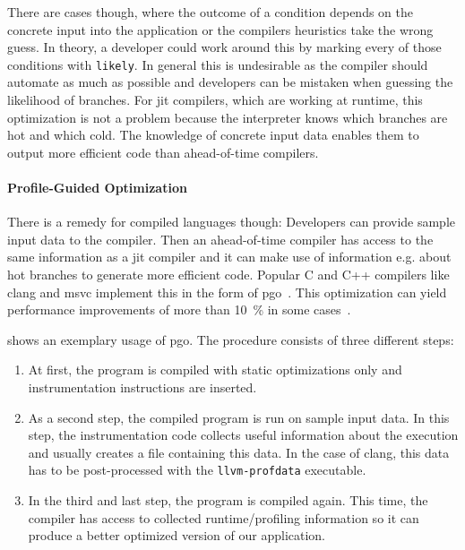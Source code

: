 There are cases though, where the outcome of a condition depends on the concrete input into the application or the compilers heuristics take the wrong guess. In theory, a developer could work around this by marking every of those conditions with \texttt{likely}. In general this is undesirable as the compiler should automate as much as possible and developers can be mistaken when guessing the likelihood of branches.
For \gls{jit} compilers, which are working at runtime, this optimization is not a problem because the interpreter knows which branches are hot and which cold. The knowledge of concrete input data enables them to output more efficient code than ahead-of-time compilers.

\paragraph{Profile-Guided Optimization} There is a remedy for compiled languages though: Developers can provide sample input data to the compiler.
Then an ahead-of-time compiler has access to the same information as a \gls{jit} compiler and it can make use of information e.g. about hot branches to generate more efficient code.
Popular C and C++ compilers like clang and msvc implement this in the form of \gls{pgo}~\cite{ClangManual, MicrosoftPgo}.
This optimization can yield performance improvements of more than \SI{10}{\percent} in some cases~\cite{LarabelPgo2018}.

 shows an exemplary usage of \gls{pgo}. The procedure consists of three different steps:
\begin{enumerate}
	\item At first, the program is compiled with static optimizations only and instrumentation instructions are inserted.
	\item As a second step, the compiled program is run on sample input data. In this step, the instrumentation code collects useful information about the execution and usually creates a file containing this data. In the case of clang, this data has to be post-processed with the \texttt{llvm-profdata} executable.
	\item In the third and last step, the program is compiled again. This time, the compiler has access to collected runtime/profiling information so it can produce a better optimized version of our application.
\end{enumerate}



